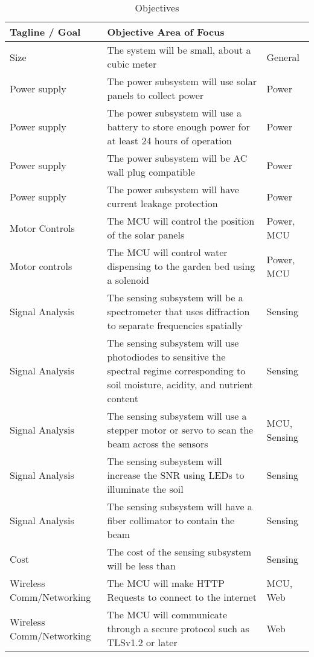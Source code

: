 \begin{table}[H]
  \centering
  \begin{tabular}{|p{3cm}|p{7cm}|p{3cm}|}
    \hline
    Tagline / Goal & Objective	Area of Focus\\
    \hline
    Size & The system will be small, about a cubic meter & General\\
    \hline
    Power supply & The power subsystem will use solar panels to collect power & Power\\
    \hline
    Power supply & The power subsystem will use a battery to store enough power for at least 24 hours of operation & Power\\
    \hline
    Power supply & The power subsystem will be AC wall plug compatible & Power\\
    \hline
    Power supply & The power subsystem will have current leakage protection & Power\\
    \hline
    Motor Controls & The MCU will control the position of the solar panels & Power, MCU\\
    \hline
    Motor controls & The MCU will control water dispensing to the garden bed using a solenoid & Power, MCU\\
    \hline
    Signal Analysis & The sensing subsystem will be a spectrometer that uses diffraction to separate frequencies spatially & Sensing\\
    \hline
    Signal Analysis & The sensing subsystem will use photodiodes to sensitive the spectral regime corresponding to soil moisture, acidity, and nutrient content & Sensing\\
    \hline
    Signal Analysis & The sensing subsystem will use a stepper motor or servo to scan the beam across the sensors & MCU, Sensing\\
    \hline
    Signal Analysis & The sensing subsystem will increase the SNR using LEDs to illuminate the soil & Sensing\\
    \hline
    Signal Analysis & The sensing subsystem will have a fiber collimator to contain the beam & Sensing\\
    \hline
    Cost & The cost of the sensing subsystem will be less than \textdollar1000 & Sensing\\
    \hline
    Wireless Comm/Networking & The MCU will make HTTP Requests to connect to the internet & MCU, Web\\
    \hline
    Wireless Comm/Networking & The MCU will communicate through a secure protocol such as TLSv1.2 or later & Web\\
    \hline
  \end{tabular}
  \label{table:Objectives}
  \caption{Objectives}
\end{table}



